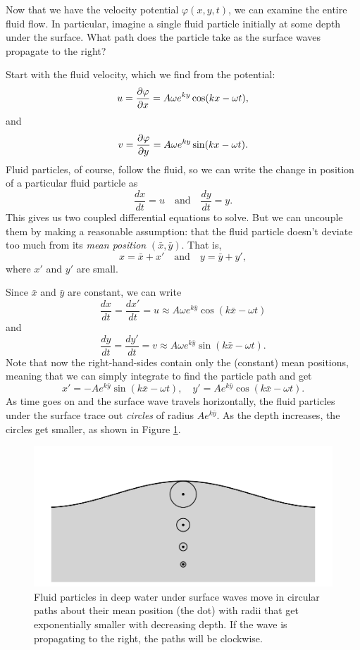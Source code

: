 \begin{example}

Now that we have the velocity potential $\varphi(x, y, t)$, we can examine the entire fluid flow.  In particular, imagine a single fluid particle initially at some depth under the surface.  What path does the particle take as the surface waves propagate to the right?

Start with the fluid velocity, which we find from the potential:
\[
u = \frac{\partial {\varphi}}{\partial {x}} = A \omega e^{ky} \cos (kx - \omega t),
\]
and
\[
v = \frac{\partial {\varphi}}{\partial {y}} = A \omega e^{ky} \sin (kx - \omega t).
\]
Fluid particles, of course, follow the fluid, so we can write the change in position of a particular fluid particle as
\[
\frac{dx}{dt} = u \quad \text{and} \quad \frac{dy}{dt} = y.
\]
This gives us two coupled differential equations to solve.  But we can uncouple them by making a reasonable assumption:  that the fluid particle doesn't deviate too much from its \emph{mean position} $(\bar{x}, \bar{y})$.  That is, 
\[
x = \bar{x} + x'  \quad \text{and} \quad y = \bar{y} + y',
\]
where $x'$ and $y'$ are small.

Since $\bar{x}$ and $\bar{y}$ are constant, we can write
\[
\frac{dx}{dt} = \frac{dx'}{dt} = u \approx A \omega e^{k\bar{y}} \cos (k \bar{x} - \omega t)
\]
and 
\[
\frac{dy}{dt} = \frac{dy'}{dt} = v \approx A \omega e^{k\bar{y}} \sin (k \bar{x} - \omega t).
\]
Note that now the right-hand-sides contain only the (constant) mean positions, meaning that we can simply integrate to find the particle path and get
\begin{equation}
x' = -A e^{k\bar{y}} \sin(k\bar{x} - \omega t), \quad  y' = A e^{k\bar{y}} \cos (k\bar{x} - \omega t).
\end{equation}
As time goes on and the surface wave travels horizontally, the fluid particles under the surface trace out \emph{circles} of radius $Ae^{k\bar{y}}$.  As the depth increases, the circles get smaller, as shown in Figure \ref{fig_circle_paths}.

\end{example}


\begin{figure}
\centering\includegraphics[width=0.8\linewidth]{Figures/Chapter5/fig_circle_paths}
\caption{Fluid particles in deep water under surface waves move in circular paths about their mean position (the dot) with radii that get exponentially smaller with decreasing depth.  If the wave is propagating to the right, the paths will be clockwise.}
\label{fig_circle_paths}
\end{figure}

